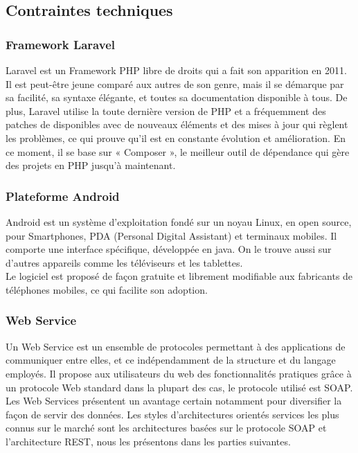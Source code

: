 {\subsection{Contraintes techniques}
\subsubsection{Framework Laravel}
Laravel est un Framework PHP libre de droits qui a fait son apparition en 2011. Il est peut-être jeune comparé aux autres de son genre, mais il se démarque par sa facilité, sa syntaxe élégante, et toutes sa documentation disponible à tous. De plus, Laravel utilise la toute dernière version de PHP et a fréquemment des patches de disponibles avec de nouveaux éléments et des mises à jour qui règlent les problèmes, ce qui prouve qu'il est en constante évolution et amélioration. En ce moment, il se base sur « Composer », le meilleur outil de dépendance qui gère des projets en PHP jusqu'à maintenant.\cite{laravel}

\subsubsection{Plateforme Android}
Android est un système d'exploitation fondé sur un noyau Linux, en open source, pour Smartphones, PDA (Personal Digital Assistant) et terminaux mobiles. Il comporte une interface spécifique, développée en java. On le trouve aussi sur d'autres appareils comme les téléviseurs et les tablettes.\\
Le logiciel est proposé de façon gratuite et librement modifiable aux fabricants de téléphones mobiles, ce qui facilite son adoption.\cite{android}

\subsubsection{Web Service}
Un Web Service est un ensemble de protocoles permettant à des applications de communiquer entre elles, et ce indépendamment de la structure et du langage employés. Il propose aux utilisateurs du web des fonctionnalités pratiques grâce à un protocole Web standard dans la plupart des cas, le protocole utilisé est SOAP. Les Web Services présentent un avantage certain notamment pour diversifier la façon de servir des données. Les styles d'architectures orientés services les plus connus sur le marché sont les architectures basées sur le protocole SOAP et l'architecture REST, nous les présentons dans les parties suivantes.

}
